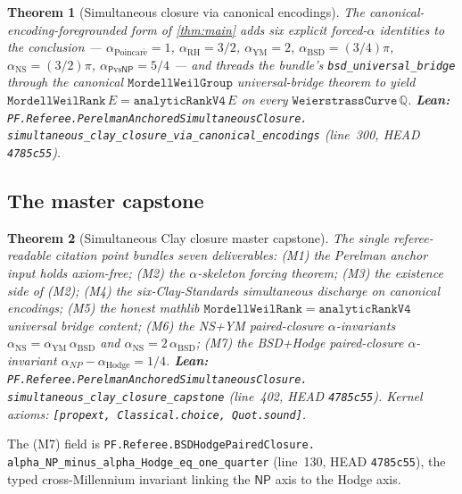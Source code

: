 \documentclass[11pt,a4paper]{article}
\theoremstyle{plain}
\newtheorem{theorem}{Theorem}[section]
\theoremstyle{definition}
\begin{document}
\begin{theorem}[Simultaneous closure via canonical encodings]
\label{thm:canonical-variant}
The canonical-encoding-foregrounded form of \cref{thm:main} adds
six explicit forced-$\alpha$ identities to the conclusion ---
$\alpha_{\mathrm{Poincar\acute e}} = 1$, $\alpha_{\mathrm{RH}} = 3/2$,
$\alpha_{\mathrm{YM}} = 2$, $\alpha_{\mathrm{BSD}} = (3/4)\pi$,
$\alpha_{\mathrm{NS}} = (3/2)\pi$,
$\alpha_{\mathsf{P}\mathrm{vs}\mathsf{NP}} = 5/4$ --- and threads
the bundle's \texttt{bsd\_universal\_bridge} through the canonical
$\mathtt{MordellWeilGroup}$ universal-bridge theorem to yield
$\mathtt{MordellWeilRank}\, E = \mathtt{analyticRankV4}\, E$ on every
$\mathtt{WeierstrassCurve}\, \mathbb{Q}$.
\textbf{Lean:}
\texttt{PF.Referee.PerelmanAnchoredSimultaneousClosure.\\
simultaneous\_clay\_closure\_via\_canonical\_encodings}
(line~300, HEAD \texttt{4785c55}).
\end{theorem}

\subsection{The master capstone}
\label{sec:master-capstone}

\begin{theorem}[Simultaneous Clay closure master capstone]
\label{thm:capstone}
The single referee-readable citation point bundles seven
deliverables: (M1) the Perelman anchor input holds axiom-free;
(M2) the $\alpha$-skeleton forcing theorem; (M3) the existence side
of (M2); (M4) the six-Clay-Standards simultaneous discharge on
canonical encodings; (M5) the honest mathlib $\mathtt{MordellWeilRank}
= \mathtt{analyticRankV4}$ universal bridge content; (M6) the
NS+YM paired-closure $\alpha$-invariants
$\alpha_{\mathrm{NS}} = \alpha_{\mathrm{YM}}\, \alpha_{\mathrm{BSD}}$
and $\alpha_{\mathrm{NS}} = 2\, \alpha_{\mathrm{BSD}}$; (M7) the
BSD+Hodge paired-closure $\alpha$-invariant
$\alpha_{NP} - \alpha_{\mathrm{Hodge}} = 1/4$.
\textbf{Lean:}
\texttt{PF.Referee.PerelmanAnchoredSimultaneousClosure.\\
simultaneous\_clay\_closure\_capstone}
(line~402, HEAD \texttt{4785c55}). Kernel axioms:
\texttt{[propext, Classical.choice, Quot.sound]}.
\end{theorem}

The (M7) field is
\texttt{PF.Referee.BSDHodgePairedClosure.\\
alpha\_NP\_minus\_alpha\_Hodge\_eq\_one\_quarter}
(line~130, HEAD \texttt{4785c55}), the typed
cross-Millennium invariant linking the $\mathsf{NP}$ axis to the
Hodge axis.
\end{document}
